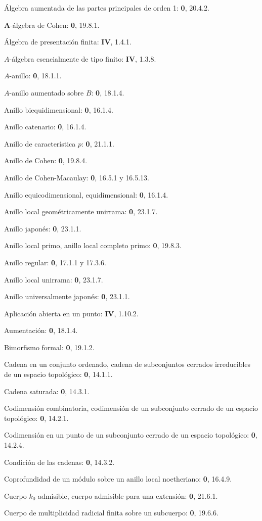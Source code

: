 Álgebra aumentada de las partes principales de orden 1: \textbf{0}, 20.4.2.\par
$\mathbf{A}$-álgebra de Cohen: \textbf{0}, 19.8.1.\par
Álgebra de presentación finita: \textbf{IV}, 1.4.1.\par
$A$-álgebra esencialmente de tipo finito: \textbf{IV}, 1.3.8.\par
$A$-anillo: \textbf{0}, 18.1.1.\par
$A$-anillo aumentado sobre $B$: \textbf{0}, 18.1.4.\par
Anillo biequidimensional: \textbf{0}, 16.1.4.\par
Anillo catenario: \textbf{0}, 16.1.4.\par
Anillo de característica $p$: \textbf{0}, 21.1.1.\par
Anillo de Cohen: \textbf{0}, 19.8.4.\par
Anillo de Cohen-Macaulay: \textbf{0}, 16.5.1 y 16.5.13.\par
Anillo equicodimensional, equidimensional: \textbf{0}, 16.1.4.\par
Anillo local geométricamente unirrama: \textbf{0}, 23.1.7.\par
Anillo japonés: \textbf{0}, 23.1.1.\par
Anillo local primo, anillo local completo primo: \textbf{0}, 19.8.3.\par
Anillo regular: \textbf{0}, 17.1.1 y 17.3.6.\par
Anillo local unirrama: \textbf{0}, 23.1.7.\par
Anillo universalmente japonés: \textbf{0}, 23.1.1.\par
Aplicación abierta en un punto: \textbf{IV}, 1.10.2.\par
Aumentación: \textbf{0}, 18.1.4.\par

Bimorfismo formal: \textbf{0}, 19.1.2.\par

Cadena en un conjunto ordenado, cadena de subconjuntos cerrados irreducibles de un espacio topológico: \textbf{0}, 14.1.1.\par
Cadena saturada: \textbf{0}, 14.3.1.\par
Codimensión combinatoria, codimensión de un subconjunto cerrado de un espacio topológico: \textbf{0}, 14.2.1.\par
Codimensión en un punto de un subconjunto cerrado de un espacio topológico: \textbf{0}, 14.2.4.\par
Condición de las cadenas: \textbf{0}, 14.3.2.\par
Coprofundidad de un módulo sobre un anillo local noetheriano: \textbf{0}, 16.4.9.\par
Cuerpo $k_0$-admisible, cuerpo admisible para una extensión: \textbf{0}, 21.6.1.\par
Cuerpo de multiplicidad radicial finita sobre un subcuerpo: \textbf{0}, 19.6.6.\par

